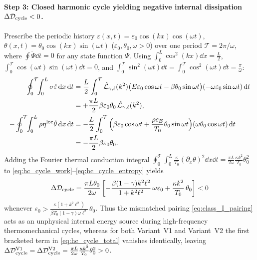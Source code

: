 \paragraph{Step 3: Closed harmonic cycle yielding negative internal dissipation $\Delta\mathcal{D}_{\mathrm{cycle}} < 0$.}
Prescribe the periodic history $\varepsilon(x,t) = \varepsilon_0\cos(kx)\cos(\omega t)$, $\theta(x,t) = \theta_0\cos(kx)\sin(\omega t)$ ($\varepsilon_0,\theta_0,\omega > 0$) over one period $\mathcal{T} = 2\pi/\omega$, where $\oint \dot{\Psi}\dd t = 0$ for any state function $\Psi$. Using $\int_0^L \cos^2(kx)\dd x = \frac{L}{2}$, $\int_0^{\mathcal{T}}\cos(\omega t)\sin(\omega t)\dd t = 0$, and $\int_0^{\mathcal{T}}\sin^2(\omega t)\dd t = \int_0^{\mathcal{T}}\cos^2(\omega t)\dd t = \frac{\pi}{\omega}$:
\begin{align}
  \oint_{0}^{\mathcal{T}}\!\!\int_0^L \sigma\dot{\varepsilon}\,\mathrm{d} x\,\mathrm{d} t &= \frac{L}{2}\int_0^{\mathcal{T}} \hat{\mathcal{L}}_{\gamma,\ell}(k^2)\big(E\varepsilon_0\cos\omega t - \beta\theta_0\sin\omega t\big)(-\omega\varepsilon_0\sin\omega t)\,\mathrm{d} t \nonumber\\
  &= +\frac{\pi L}{2}\beta\varepsilon_0\theta_0\,\hat{\mathcal{L}}_{\gamma,\ell}(k^2), \label{eq:hc_cycle_work}\\
  -\oint_{0}^{\mathcal{T}}\!\!\int_0^L \rho\eta^{\mathrm{loc}}\dot{\theta}\,\mathrm{d} x\,\mathrm{d} t &= -\frac{L}{2}\int_0^{\mathcal{T}} \Big(\beta\varepsilon_0\cos\omega t + \frac{\rho c_E}{T_0}\theta_0\sin\omega t\Big)(\omega\theta_0\cos\omega t)\,\mathrm{d} t \nonumber\\
  &= -\frac{\pi L}{2}\beta\varepsilon_0\theta_0. \label{eq:hc_cycle_entropy}
\end{align}
Adding the Fourier thermal conduction integral $\oint_0^{\mathcal{T}}\int_0^L \frac{\kappa}{T_0}(\partial_x\theta)^2\dd x\dd t = \frac{\pi L}{2\omega}\frac{\kappa k^2}{T_0}\theta_0^2$ to \eqref{eq:hc_cycle_work}--\eqref{eq:hc_cycle_entropy} yields
\begin{equation}\label{eq:hc_cycle_total}
  \Delta\mathcal{D}_{\mathrm{cycle}} = \frac{\pi L\theta_0}{2\omega}\left[-\frac{\beta(1-\gamma)k^2\ell^2}{1 + k^2\ell^2}\,\omega\varepsilon_0 + \frac{\kappa k^2}{T_0}\,\theta_0\right] < 0
\end{equation}
whenever $\varepsilon_0 > \frac{\kappa(1 + k^2\ell^2)}{\beta T_0(1-\gamma)\omega\ell^2}\,\theta_0$. Thus the mismatched pairing \eqref{eq:class_I_pairing} acts as an unphysical internal energy source during high-frequency thermomechanical cycles, whereas for both Variant~V1 and Variant~V2 the first bracketed term in \eqref{eq:hc_cycle_total} vanishes identically, leaving $\Delta\mathcal{D}_{\mathrm{cycle}}^{\mathrm{V1}} = \Delta\mathcal{D}_{\mathrm{cycle}}^{\mathrm{V2}} = \frac{\pi L}{2\omega}\frac{\kappa k^2}{T_0}\theta_0^2 > 0$.
